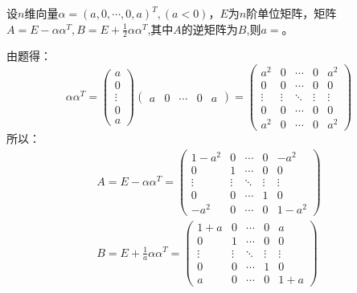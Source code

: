 \documentclass[a4paper]{report}
\begin{document}
\EX 设$n$维向量$\alpha=(a,0,\cdots,0,a)^T,(a<0)$，$E$为$n$阶单位矩阵，矩阵$A=E-\alpha\alpha^T,B=E+\frac{1}{2}\alpha\alpha^T$,其中$A$的逆矩阵为$B$,则$a=$\underline{\hphantom{~~~~~~~~~~~}}。

\begin{jie}
由题得：
\begin{equation*}
\alpha\alpha^T=
\begin{pmatrix}
a\\ 0\\ \vdots\\ 0\\ a
\end{pmatrix}\begin{pmatrix}
a& 0&\cdots& 0&a
\end{pmatrix}=
\begin{pmatrix}
a^2&0&\cdots&0&a^2\\
0&0&\cdots&0&0\\
\vdots&\vdots&\ddots&\vdots&\vdots\\
0&0&\cdots&0&0\\
a^2&0&\cdots&0&a^2
\end{pmatrix}
\end{equation*}
所以：
\begin{gather*}
A=E-\alpha\alpha^T=
\begin{pmatrix}
1-a^2&0&\cdots&0&-a^2\\
0&1&\cdots&0&0\\
\vdots&\vdots&\ddots&\vdots&\vdots\\
0&0&\cdots&1&0\\
-a^2&0&\cdots&0&1-a^2
\end{pmatrix}\\
B=E+\frac{1}{a}\alpha\alpha^T=
\begin{pmatrix}
1+a&0&\cdots&0&a\\
0&1&\cdots&0&0\\
\vdots&\vdots&\ddots&\vdots&\vdots\\
0&0&\cdots&1&0\\
a&0&\cdots&0&1+a
\end{pmatrix}
\end{gather*}


\end{jie}
\end{document}
